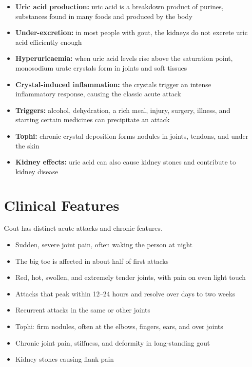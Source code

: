 \begin{itemize}
    \item \textbf{Uric acid production:} uric acid is a breakdown product of purines, substances found in many foods and produced by the body
    \item \textbf{Under-excretion:} in most people with gout, the kidneys do not excrete uric acid efficiently enough
    \item \textbf{Hyperuricaemia:} when uric acid levels rise above the saturation point, monosodium urate crystals form in joints and soft tissues
    \item \textbf{Crystal-induced inflammation:} the crystals trigger an intense inflammatory response, causing the classic acute attack
    \item \textbf{Triggers:} alcohol, dehydration, a rich meal, injury, surgery, illness, and starting certain medicines can precipitate an attack
    \item \textbf{Tophi:} chronic crystal deposition forms nodules in joints, tendons, and under the skin
    \item \textbf{Kidney effects:} uric acid can also cause kidney stones and contribute to kidney disease
\end{itemize}

\section*{Clinical Features}
Gout has distinct acute attacks and chronic features.

\begin{itemize}
    \item Sudden, severe joint pain, often waking the person at night
    \item The big toe is affected in about half of first attacks
    \item Red, hot, swollen, and extremely tender joints, with pain on even light touch
    \item Attacks that peak within 12--24 hours and resolve over days to two weeks
    \item Recurrent attacks in the same or other joints
    \item Tophi: firm nodules, often at the elbows, fingers, ears, and over joints
    \item Chronic joint pain, stiffness, and deformity in long-standing gout
    \item Kidney stones causing flank pain
\end{itemize}

